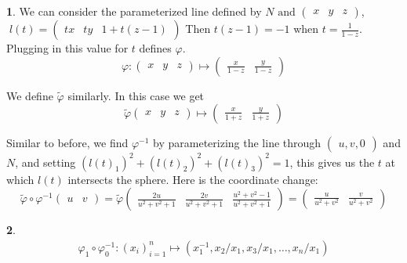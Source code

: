 \documentclass[10.5pt]{article}
\theoremstyle{definition}
\newtheorem{pb}{}
\newcommand{\tand}{\text{ and }}
\begin{document}
\begin{pb}
    We can consider the parameterized line defined by \(N \tand \begin{pmatrix}
        x&y&z
    \end{pmatrix}\), \( \; l(t) = \begin{pmatrix}
        tx&ty&1 + t(z-1)
    \end{pmatrix}\) Then \(t(z-1) = -1\) when \(t = \frac{1}{1-z}\). Plugging in this value for \(t\) defines \(\varphi\).
    \[\varphi: \begin{pmatrix}
        x&y&z
    \end{pmatrix} \mapsto \begin{pmatrix}
        \frac{x}{1-z}& \frac{y}{1-z}
    \end{pmatrix}\]

    We define \(\tilde{\varphi}\) similarly. In this case we get
    \[\tilde{\varphi} \begin{pmatrix}
        x&y&z
    \end{pmatrix} \mapsto \begin{pmatrix}
        \frac{x}{1+z}& \frac{y}{1+z}
    \end{pmatrix}\]

    Similar to before, we find \(\varphi^{-1}\) by parameterizing the line through \(\begin{pmatrix}
        u,v,0
    \end{pmatrix}\) and \(N\), and setting \((l(t)_1)^2 + (l(t)_2)^2 + (l(t)_3)^2 = 1\), this gives us the \(t\) at which \(l(t)\) intersects the sphere.
    Here is the coordinate change:
    \[\tilde{\varphi}\circ \varphi^{-1}\begin{pmatrix}
        u&v
    \end{pmatrix} = \tilde{\varphi}\begin{pmatrix}
        \frac{2u}{u^2+v^2+1}&\frac{2v}{u^2+v^2+1}&\frac{u^2+v^2-1}{u^2+v^2+1}
    \end{pmatrix} = \begin{pmatrix}
       \frac{u}{u^2+v^2}&\frac{v}{u^2+v^2}
    \end{pmatrix}\]
\end{pb}
\begin{pb}
    \begin{align*}
        \varphi_1\circ\varphi_0^{-1}: (x_i)_{i=1}^n \mapsto (x_1^{-1},x_2/x_1, x_3/x_1, \hdots, x_n/x_1)
    \end{align*}
\end{pb}
\end{document}

